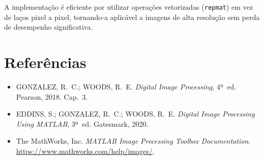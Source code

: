 \documentclass[12pt,a4paper]{article}
\begin{document}
A implementação é eficiente por utilizar operações vetorizadas
(\texttt{repmat}) em vez de laços pixel a pixel, tornando-a aplicável a
imagens de alta resolução sem perda de desempenho significativa.

\section*{Referências}
\begin{itemize}
  \item GONZALEZ, R.~C.; WOODS, R.~E. \textit{Digital Image Processing},
        4ª~ed. Pearson, 2018. Cap.~3.
  \item EDDINS, S.; GONZALEZ, R.~C.; WOODS, R.~E. \textit{Digital Image
        Processing Using MATLAB}, 3ª~ed. Gatesmark, 2020.
  \item The MathWorks, Inc. \textit{MATLAB Image Processing Toolbox
        Documentation}. \url{https://www.mathworks.com/help/images/}.
\end{itemize}
\end{document}

